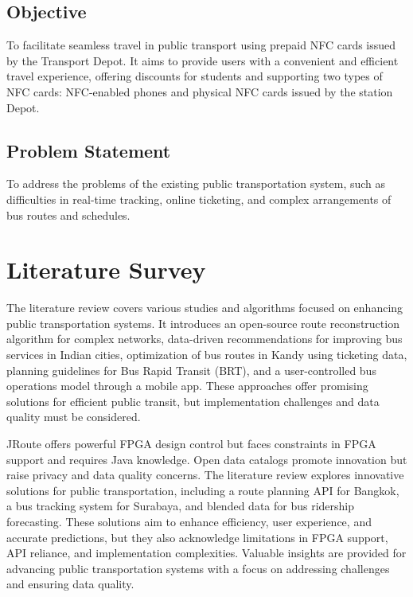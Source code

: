 \documentclass[a4paper, 12pt]{article}
\begin{document}
\subsection{Objective}

To facilitate seamless travel in public transport using prepaid NFC cards issued by the Transport Depot. It aims to provide users with a convenient and efficient travel experience, offering discounts for students and supporting two types of NFC cards: NFC-enabled phones and physical NFC cards issued by the station Depot.

\subsection{Problem Statement}

To address the problems of the existing public transportation system, such as difficulties in real-time tracking, online ticketing, and complex arrangements of bus routes and schedules.
\newpage

\section{Literature Survey}

The literature review covers various studies and algorithms focused on enhancing public transportation systems. It introduces an open-source route reconstruction algorithm for complex networks, data-driven recommendations for improving bus services in Indian cities, optimization of bus routes in Kandy using ticketing data, planning guidelines for Bus Rapid Transit (BRT), and a user-controlled bus operations model through a mobile app. These approaches offer promising solutions for efficient public transit, but implementation challenges and data quality must be considered.

JRoute offers powerful FPGA design control but faces constraints in FPGA support and requires Java knowledge. Open data catalogs promote innovation but raise privacy and data quality concerns. The literature review explores innovative solutions for public transportation, including a route planning API for Bangkok, a bus tracking system for Surabaya, and blended data for bus ridership forecasting. These solutions aim to enhance efficiency, user experience, and accurate predictions, but they also acknowledge limitations in FPGA support, API reliance, and implementation complexities. Valuable insights are provided for advancing public transportation systems with a focus on addressing challenges and ensuring data quality.
\end{document}
